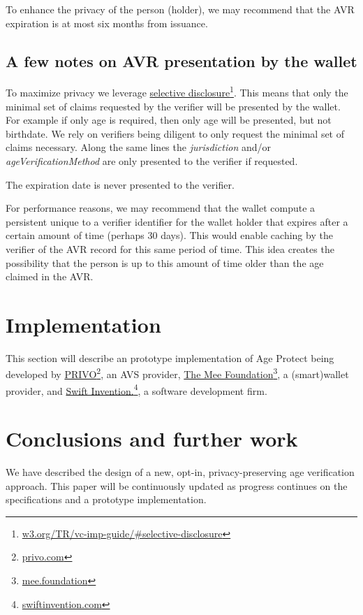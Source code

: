 \documentclass[11pt, oneside]{article}   	%
\newcommand{\hyperfootnote}[1][]{\def\ArgI{{#1}}\hyperfootnoteRelay}
\newcommand\hyperfootnoteRelay[2][]{\href{#1#2}{\ArgI}\footnote{\href{#1#2}{#2}}}
\begin{document}
To enhance the privacy of the person (holder), we may recommend that the AVR expiration is at most six months from issuance. 

\subsection{A few notes on AVR presentation by the wallet}

To maximize privacy we leverage \hyperfootnote[selective disclosure][https://]{w3.org/TR/vc-imp-guide/\#selective-disclosure}. This means that only the minimal set of claims requested by the verifier will be presented by the wallet. For example if only age is required, then only age will be presented, but not birthdate. We rely on verifiers being diligent to only request the minimal set of claims necessary. Along the same lines the \emph{jurisdiction} and/or \emph{ageVerificationMethod} are only presented to the verifier if requested. 

The expiration date is never presented to the verifier.

For performance reasons, we may recommend that the wallet compute a persistent unique to a verifier identifier for the wallet holder that expires after a certain amount of time (perhaps 30 days). This would enable caching by the verifier of the AVR record for this same period of time. This idea creates the possibility that the person is up to this amount of time older than the age claimed in the AVR. 

\section{Implementation}

This section will describe an prototype implementation of Age Protect being developed by \hyperfootnote[PRIVO][https://]{privo.com}, an AVS provider, \hyperfootnote[The Mee Foundation][https://]{mee.foundation}, a (smart)wallet provider, and \hyperfootnote[Swift Invention.][https://]{swiftinvention.com}, a software development firm.

\section{Conclusions and further work}
We have described the design of a new, opt-in, privacy-preserving age verification approach. This paper will be continuously updated as progress continues on the specifications and a prototype implementation.



\end{document}
